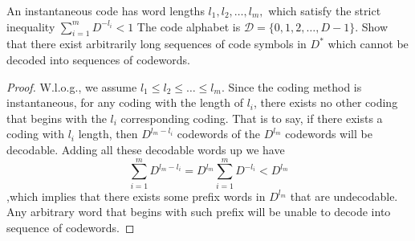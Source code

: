 \begin{exercise}{An instantaneous code has word lengths $l_{1}, l_{2}, \ldots, l_{m},$ which satisfy the strict inequality
  $\sum_{i=1}^{m} D^{-l_{i}}<1$
  The code alphabet is $\mathcal{D}=\{0,1,2, \ldots, D-1\} .$ Show that there exist arbitrarily long sequences of code symbols in $D^{*}$ which cannot be decoded into sequences of codewords.}
  \begin{proof}
  W.l.o.g., we assume $l_1\le l_2 \le \ldots \le l_m$. Since the coding method is instantaneous, for any coding with the length of $l_i$, there exists no other coding that begins with the $l_i$ corresponding coding. That is to say, if there exists a coding with $l_i$ length, then $D^{l_m-l_i}$ codewords of the $D^{l_m}$ codewords will be decodable. Adding all these decodable words up we have
  \begin{equation}
    \sum_{i=1}^{m} D^{l_m-l_i} = D^{l_m} \sum_{i=1}^{m} D^{-l_i} < D^{l_m}
  \end{equation}
  ,which implies that there exists some prefix words in $D^{l_m}$ that are undecodable. Any arbitrary word that begins with such prefix will be unable to decode into sequence of codewords.
  \end{proof}
  \label{ex1}
\end{exercise}

